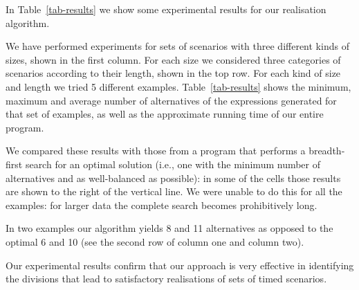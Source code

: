In Table~\ref{tab-results} we show some experimental results for our
realisation algorithm.

We have performed experiments for sets of scenarios with three
different kinds of sizes, shown in the first column.
For each size we considered three categories
of scenarios according to their length, shown in the top row.
For each kind of size and length we tried 5 different examples.
Table~\ref{tab-results} shows the minimum, maximum and
average number of alternatives of the expressions generated for that
set of examples, as well as the approximate running time of our entire program.

We compared these results with those from a program that performs
a breadth-first search for an optimal solution (i.e., one with the minimum
number of alternatives and as well-balanced as possible): in some of
the cells those results are
shown to the right of the vertical line.
We were unable to do this for all the examples:
for larger data the complete search becomes prohibitively long.

In two examples our algorithm yields 8 and 11 alternatives as opposed to the
optimal 6 and 10 (see the second row of column one and column two).



Our experimental results confirm that our approach is very
effective in identifying the divisions that lead to satisfactory
realisations of sets of timed scenarios.

